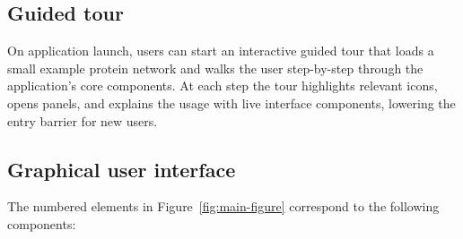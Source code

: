 \subsection{Guided tour}
On application launch, users can start an interactive guided tour that loads a small example protein network and walks the user step-by-step through the application's core components. At each step the tour highlights relevant icons, opens panels, and explains the usage with live interface components, lowering the entry barrier for new users.

\subsection{Graphical user interface}
The numbered elements in Figure~\ref{fig:main-figure} correspond to the following components:

